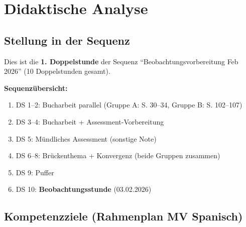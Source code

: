 \documentclass[11pt,a4paper]{article}
\newcommand{\reihenthema}{Beobachtungsvorbereitung Feb 2026}
\newcommand{\stundennummer}{1}
\newcommand{\reihenstunden}{10}
\begin{document}
\section{Didaktische Analyse}

\subsection{Stellung in der Sequenz}
Dies ist die \textbf{\stundennummer. Doppelstunde} der Sequenz ``\reihenthema'' (\reihenstunden{} Doppelstunden gesamt).

\textbf{Sequenzübersicht:}
\begin{enumerate}
    \item DS 1--2: Bucharbeit parallel (Gruppe A: S. 30--34, Gruppe B: S. 102--107)
    \item DS 3--4: Bucharbeit + Assessment-Vorbereitung
    \item DS 5: Mündliches Assessment (sonstige Note)
    \item DS 6--8: Brückenthema + Konvergenz (beide Gruppen zusammen)
    \item DS 9: Puffer
    \item DS 10: \textbf{Beobachtungsstunde} (03.02.2026)
\end{enumerate}

\subsection{Kompetenzziele (Rahmenplan MV Spanisch)}
\end{document}
